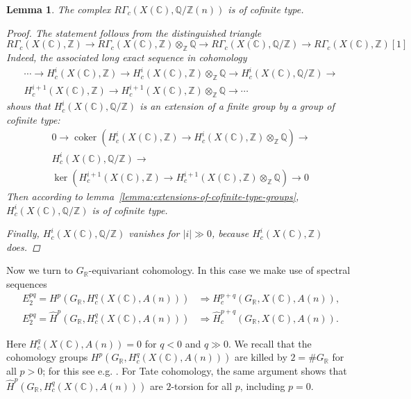 \documentclass[draft,leqno,12pt]{article}
\theoremstyle{plain}
\newtheorem{lemma}[theorem]{\indent\sc Lemma}
\theoremstyle{definition}
\DeclareMathOperator{\coker}{coker}
\newcommand{\ZZ}{\mathbb{Z}}
\newcommand{\QQ}{\mathbb{Q}}
\newcommand{\RR}{\mathbb{R}}
\newcommand{\CC}{\mathbb{C}}
\begin{document}
\begin{lemma}
  The complex $R\Gamma_c (X (\CC), \QQ/\ZZ (n))$ is of cofinite type.

  \begin{proof}
    The statement follows from the distinguished triangle
    \[ R\Gamma_c (X (\CC), \ZZ) \to
    R\Gamma_c (X (\CC), \ZZ)\otimes_\ZZ \QQ \to
    R\Gamma_c (X (\CC), \QQ/\ZZ) \to
    R\Gamma_c (X (\CC), \ZZ) [1] \]
    Indeed, the associated long exact sequence in cohomology
    \begin{multline*}
      \cdots \to H^i_c (X (\CC), \ZZ) \to
      H^i_c (X (\CC), \ZZ)\otimes_\ZZ \QQ \to
      H^i_c (X (\CC), \QQ/\ZZ) \to\\
      H^{i+1}_c (X (\CC), \ZZ) \to
      H^{i+1}_c (X (\CC), \ZZ)\otimes_\ZZ \QQ \to \cdots
    \end{multline*}
    shows that $H^i_c (X (\CC), \QQ/\ZZ)$ is an extension of a finite group by a
    group of cofinite type:
    \begin{multline*}
      0 \to \coker (H^i_c (X (\CC), \ZZ) \to
      H^i_c (X (\CC), \ZZ)\otimes_\ZZ \QQ) \to\\
      H^i_c (X (\CC), \QQ/\ZZ) \to\\
      \ker (H^{i+1}_c (X (\CC), \ZZ) \to
      H^{i+1}_c (X (\CC), \ZZ)\otimes_\ZZ \QQ) \to 0
    \end{multline*}
    Then according to lemma~\ref{lemma:extensions-of-cofinite-type-groups},
    $H^i_c (X (\CC), \QQ/\ZZ)$ is of cofinite type.

    Finally, $H^i_c (X (\CC), \QQ/\ZZ)$ vanishes for $|i| \gg 0$, because
    $H^i_c (X (\CC), \ZZ)$ does.
  \end{proof}
\end{lemma}

Now we turn to $G_\RR$-equivariant cohomology. In this case we make use of
spectral sequences
\begin{align*}
  E_2^{pq} = H^p (G_\RR, H_c^q (X (\CC), A (n))) & \Longrightarrow H_c^{p+q} (G_\RR, X (\CC), A (n)), \\
  E_2^{pq} = \widehat{H}^p (G_\RR, H_c^q (X (\CC), A (n))) & \Longrightarrow \widehat{H}_c^{p+q} (G_\RR, X (\CC), A (n)).
\end{align*}

Here $H_c^q (X (\CC), A (n)) = 0$ for $q < 0$ and $q \gg 0$. We recall that the
cohomology groups $H^p (G_\RR, H_c^q (X (\CC), A (n)))$ are killed by
$2 = \# G_\RR$ for all $p > 0$; for this see e.g.
\cite[Theorem~6.5.8]{Weibel-1994}. For Tate cohomology, the same argument shows
that $\widehat{H}^p (G_\RR, H_c^q (X (\CC), A (n)))$ are $2$-torsion for all
$p$, including $p = 0$.
\end{document}
